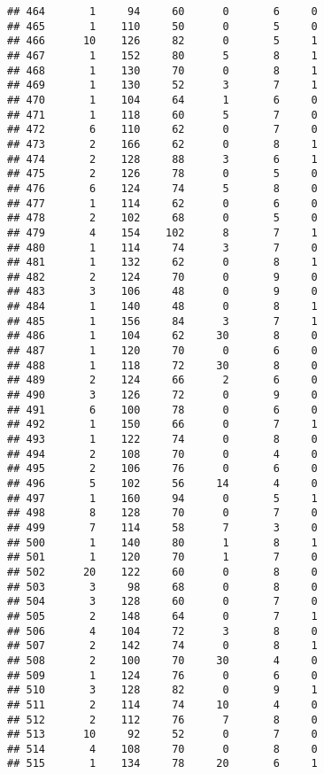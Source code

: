 \documentclass[
]{article}
\begin{document}
\begin{verbatim}
## 464       1     94     60      0       6     0
## 465       1    110     50      0       5     0
## 466      10    126     82      0       5     1
## 467       1    152     80      5       8     1
## 468       1    130     70      0       8     1
## 469       1    130     52      3       7     1
## 470       1    104     64      1       6     0
## 471       1    118     60      5       7     0
## 472       6    110     62      0       7     0
## 473       2    166     62      0       8     1
## 474       2    128     88      3       6     1
## 475       2    126     78      0       5     0
## 476       6    124     74      5       8     0
## 477       1    114     62      0       6     0
## 478       2    102     68      0       5     0
## 479       4    154    102      8       7     1
## 480       1    114     74      3       7     0
## 481       1    132     62      0       8     1
## 482       2    124     70      0       9     0
## 483       3    106     48      0       9     0
## 484       1    140     48      0       8     1
## 485       1    156     84      3       7     1
## 486       1    104     62     30       8     0
## 487       1    120     70      0       6     0
## 488       1    118     72     30       8     0
## 489       2    124     66      2       6     0
## 490       3    126     72      0       9     0
## 491       6    100     78      0       6     0
## 492       1    150     66      0       7     1
## 493       1    122     74      0       8     0
## 494       2    108     70      0       4     0
## 495       2    106     76      0       6     0
## 496       5    102     56     14       4     0
## 497       1    160     94      0       5     1
## 498       8    128     70      0       7     0
## 499       7    114     58      7       3     0
## 500       1    140     80      1       8     1
## 501       1    120     70      1       7     0
## 502      20    122     60      0       8     0
## 503       3     98     68      0       8     0
## 504       3    128     60      0       7     0
## 505       2    148     64      0       7     1
## 506       4    104     72      3       8     0
## 507       2    142     74      0       8     1
## 508       2    100     70     30       4     0
## 509       1    124     76      0       6     0
## 510       3    128     82      0       9     1
## 511       2    114     74     10       4     0
## 512       2    112     76      7       8     0
## 513      10     92     52      0       7     0
## 514       4    108     70      0       8     0
## 515       1    134     78     20       6     1

\end{verbatim}
\end{document}
